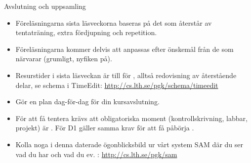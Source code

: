 \begin{Slide}{Avslutning och uppsamling}

\begin{itemize}

\item Föreläsningarna sista läsveckorna baseras på det som återstår av tentaträning, extra fördjupning och repetition.

\item Föreläsningarna kommer delvis att anpassas efter önskemål från de som närvarar (grumligt, nyfiken på).

\item Resurstider i sista läsveckan är till för , alltså redovisning av återstående delar, se schema i TimeEdit: \url{http://cs.lth.se/pgk/schema/timeedit}

\item Gör en  plan dag-för-dag för din kursavslutning.

\item För att få tentera krävs att  obligatoriska moment (kontrollskrivning, labbar, projekt) är . För D1 gäller samma krav för att få påbörja .

\item Kolla noga i denna daterade ögonblicksbild ur vårt system SAM där du ser vad du har
  och vad du ev. : \url{http://cs.lth.se/pgk/sam}

\end{itemize}

\end{Slide}


%
%
